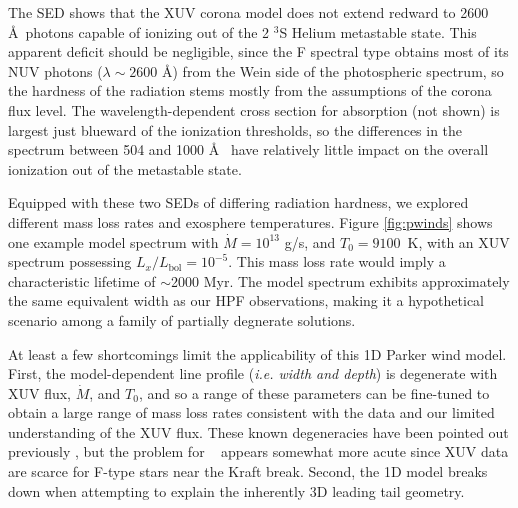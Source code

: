 \documentclass[twocolumn]{aastex631}
\newcommand{\hatpb}{\object{HAT-P-67 b}}
\begin{document}
The SED shows that the XUV corona model does not extend redward to 2600 \AA~photons capable of ionizing out of the 2 $^3$S Helium metastable state.  This apparent deficit should be negligible, since the F spectral type obtains most of its NUV photons ($\lambda\sim2600$ \AA) from the Wein side of the photospheric spectrum, so the hardness of the radiation stems mostly from the assumptions of the corona flux level.  The wavelength-dependent cross section for absorption (not shown) is largest just blueward of the ionization thresholds, so the differences in the spectrum between 504 and 1000 \AA~ have relatively little impact on the overall ionization out of the metastable state.

Equipped with these two SEDs of differing radiation hardness, we explored different mass loss rates and exosphere temperatures.  Figure \ref{fig:pwinds} shows one example model spectrum with $\dot{M} = 10^{13}$ g/s, and $T_0=9100$~K, with an XUV spectrum possessing $L_x/L_\mathrm{bol}=10^{-5}$.  This mass loss rate would imply a characteristic lifetime of $\sim$2000 Myr.  The model spectrum exhibits approximately the same equivalent width as our HPF observations, making it a hypothetical scenario among a family of partially degnerate solutions.

At least a few shortcomings limit the applicability of this 1D Parker wind model.  First, the model-dependent line profile (\emph{i.e. width and depth}) is degenerate with XUV flux, $\dot{M}$, and $T_0$, and so a range of these parameters can be fine-tuned to obtain a large range of mass loss rates consistent with the data and our limited understanding of the XUV flux.  These known degeneracies have been pointed out previously \citep{2022AJ....164..234V,2019ApJ...881..133O}, but the problem for \hatpb~ appears somewhat more acute since XUV data are scarce for F-type stars near the Kraft break.  Second, the 1D model breaks down when attempting to explain the inherently 3D leading tail geometry.
\end{document}

